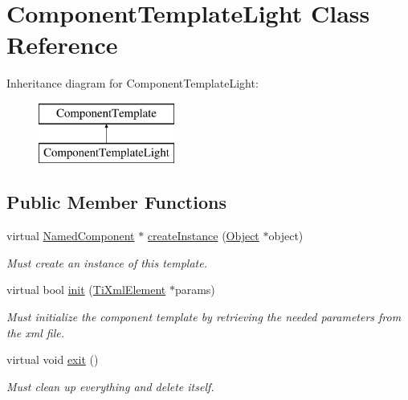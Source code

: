 \hypertarget{classComponentTemplateLight}{
\section{\-Component\-Template\-Light \-Class \-Reference}
\label{dd/de6/classComponentTemplateLight}
}
\-Inheritance diagram for \-Component\-Template\-Light\-:\begin{figure}[H]
\begin{center}
\leavevmode
\includegraphics[height=2.000000cm]{dd/de6/classComponentTemplateLight}
\end{center}
\end{figure}
\subsection*{\-Public \-Member \-Functions}
\begin{DoxyCompactItemize}
\item 
\hypertarget{classComponentTemplateLight_a7aeeedba222f4965ea1187d8a6c2de6d}{
virtual \hyperlink{classNamedComponent}{\-Named\-Component} $\ast$ \hyperlink{classComponentTemplateLight_a7aeeedba222f4965ea1187d8a6c2de6d}{create\-Instance} (\hyperlink{classObject}{\-Object} $\ast$object)}
\label{dd/de6/classComponentTemplateLight_a7aeeedba222f4965ea1187d8a6c2de6d}

\begin{DoxyCompactList}\small\item\em \-Must create an instance of this template. \end{DoxyCompactList}\item 
\hypertarget{classComponentTemplateLight_a238ae5166898fd25b39dd6985280f88e}{
virtual bool \hyperlink{classComponentTemplateLight_a238ae5166898fd25b39dd6985280f88e}{init} (\hyperlink{classTiXmlElement}{\-Ti\-Xml\-Element} $\ast$params)}
\label{dd/de6/classComponentTemplateLight_a238ae5166898fd25b39dd6985280f88e}

\begin{DoxyCompactList}\small\item\em \-Must initialize the component template by retrieving the needed parameters from the xml file. \end{DoxyCompactList}\item 
\hypertarget{classComponentTemplateLight_a6a9c863177e762e5b5681c6831ae8eb3}{
virtual void \hyperlink{classComponentTemplateLight_a6a9c863177e762e5b5681c6831ae8eb3}{exit} ()}
\label{dd/de6/classComponentTemplateLight_a6a9c863177e762e5b5681c6831ae8eb3}

\begin{DoxyCompactList}\small\item\em \-Must clean up everything and delete itself. \end{DoxyCompactList}\end{DoxyCompactItemize}
